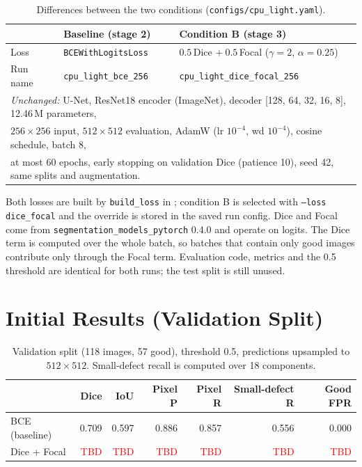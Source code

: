 \documentclass[11pt,a4paper]{article}
\newcommand{\tbd}{\textcolor{red}{TBD}}
\begin{document}
\begin{table}[H]
\centering
\small
\begin{tabularx}{\linewidth}{lXX}
\toprule
 & Baseline (stage 2) & Condition B (stage 3) \\
\midrule
Loss & \texttt{BCEWithLogitsLoss} & $0.5\,$Dice $+\ 0.5\,$Focal ($\gamma=2$, $\alpha=0.25$) \\
Run name & \texttt{cpu\_light\_bce\_256} & \texttt{cpu\_light\_dice\_focal\_256} \\
\midrule
\multicolumn{3}{l}{\textit{Unchanged:} U-Net, ResNet18 encoder (ImageNet), decoder [128, 64, 32, 16, 8], 12.46\,M parameters,} \\
\multicolumn{3}{l}{$256\times256$ input, $512\times512$ evaluation, AdamW (lr $10^{-4}$, wd $10^{-4}$), cosine schedule, batch 8,} \\
\multicolumn{3}{l}{at most 60 epochs, early stopping on validation Dice (patience 10), seed 42, same splits and augmentation.} \\
\bottomrule
\end{tabularx}
\caption{Differences between the two conditions (\texttt{configs/cpu\_light.yaml}).}
\end{table}

Both losses are built by \texttt{build\_loss} in ; condition B is selected with \texttt{--loss dice\_focal} and the override is stored in the saved run config. Dice and Focal come from \texttt{segmentation\_models\_pytorch} 0.4.0 and operate on logits. The Dice term is computed over the whole batch, so batches that contain only good images contribute only through the Focal term. Evaluation code, metrics and the 0.5 threshold are identical for both runs; the test split is still unused.

\section{Initial Results (Validation Split)}

\begin{table}[H]
\centering
\small
\begin{tabular}{lrrrrrr}
\toprule
 & Dice & IoU & Pixel P & Pixel R & Small-defect R & Good FPR \\
\midrule
BCE (baseline) & 0.709 & 0.597 & 0.886 & 0.857 & 0.556 & 0.000 \\
Dice + Focal & \tbd & \tbd & \tbd & \tbd & \tbd & \tbd \\
\bottomrule
\end{tabular}
\caption{Validation split (118 images, 57 good), threshold 0.5, predictions upsampled to $512\times512$. Small-defect recall is computed over 18 components.}
\label{tab:compare}
\end{table}
\end{document}
